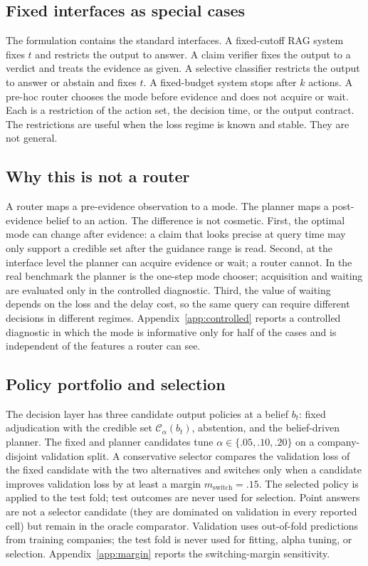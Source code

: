 \documentclass[11pt]{article}
\begin{document}
\subsection{Fixed interfaces as special cases}
The formulation contains the standard interfaces. A fixed-cutoff RAG system fixes $t$ and restricts the output to answer. A claim verifier fixes the output to a verdict and treats the evidence as given. A selective classifier restricts the output to answer or abstain and fixes $t$. A fixed-budget system stops after $k$ actions. A pre-hoc router chooses the mode before evidence and does not acquire or wait. Each is a restriction of the action set, the decision time, or the output contract. The restrictions are useful when the loss regime is known and stable. They are not general.

\subsection{Why this is not a router}
A router maps a pre-evidence observation to a mode. The planner maps a post-evidence belief to an action. The difference is not cosmetic. First, the optimal mode can change after evidence: a claim that looks precise at query time may only support a credible set after the guidance range is read. Second, at the interface level the planner can acquire evidence or wait; a router cannot. In the real benchmark the planner is the one-step mode chooser; acquisition and waiting are evaluated only in the controlled diagnostic. Third, the value of waiting depends on the loss and the delay cost, so the same query can require different decisions in different regimes. Appendix~\ref{app:controlled} reports a controlled diagnostic in which the mode is informative only for half of the cases and is independent of the features a router can see.

\subsection{Policy portfolio and selection}
\label{sec:conformal}
The decision layer has three candidate output policies at a belief \(b_t\):
fixed adjudication with the credible set \(\mathcal C_\alpha(b_t)\),
abstention, and the belief-driven planner. The fixed and planner candidates
tune \(\alpha\in\{.05,.10,.20\}\) on a company-disjoint validation split. A
conservative selector compares the validation loss of the fixed candidate
with the two alternatives and switches only when a candidate improves
validation loss by at least a margin \(m_{\text{switch}}=.15\). The selected
policy is applied to the test fold; test outcomes are never used for
selection. Point answers are not a selector candidate (they are dominated on
validation in every reported cell) but remain in the oracle comparator.
Validation uses out-of-fold predictions from training companies; the test fold
is never used for fitting, alpha tuning, or selection. Appendix~\ref{app:margin}
reports the switching-margin sensitivity.
\end{document}
